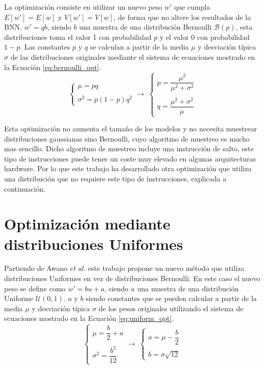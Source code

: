 La optimización consiste en utilizar un nuevo peso $w'$ que cumpla $E[w'] = E[w]$ y $V[w'] = V[w]$, de forma que no altere los resultados de la BNN. $w' = qb$, siendo $b$ una muestra de una distribución Bernoulli $\mathcal{B}(p)$, esta distribuciones toma el valor 1 con probabilidad $p$ y el valor 0 con probabilidad $1-p$. Las constantes $p$ y $q$ se calculan a partir de la media $\mu$ y desviación típica $\sigma$ de las distribuciones originales mediante el sistema de ecuaciones mostrado en la Ecuación \ref{eq:bernoulli_opt}.
\begin{equation}\label{eq:bernoulli_opt}
\begin{cases}
\mu = pq\\ \\
\sigma^2 = p(1-p)q^2
\end{cases}
\rightarrow\ 
\begin{cases}
p = \dfrac{\mu^2}{\mu^2 + \sigma^2}\\ \\
q = \dfrac{\mu^2 + \sigma^2}{\mu}
\end{cases}
\end{equation}

Esta optimización no aumenta el tamaño de los modelos y no necesita muestrear distribuciones gaussianas sino Bernoulli, cuyo algoritmo de muestreo es mucho mas sencillo. Dicho algoritmo de muestreo incluye una instrucción de salto, este tipo de instrucciones puede tener un coste muy elevado en algunas arquitecturas hardware. Por lo que este trabajo ha desarrollado otra optimización que utiliza una distribución que no requiere este tipo de instrucciones, explicada a continuación.

\section{Optimización mediante distribuciones Uniformes}

Partiendo de Awano \emph{et al.} este trabajo propone un nuevo método que utiliza distribuciones Uniformes en vez de distribuciones Bernoulli. En este caso el nuevo peso se define como $w' = bu + a$, siendo $u$ una muestra de una distribución Uniforme $\mathcal{U}(0,1)$. $a$ y $b$ siendo constantes que se pueden calcular a partir de la media $\mu$ y desviación típica $\sigma$ de los pesos originales utilizando el sistema de ecuaciones mostrado en la Ecuación \ref{eq:uniform_opt}.
\begin{equation}\label{eq:uniform_opt}
\begin{cases}
\mu = \dfrac{b}{2} + a\\ \\
\sigma^2 = \dfrac{b^2}{12}
\end{cases}
\rightarrow\ 
\begin{cases}
a = \mu - \dfrac{b}{2}\\ \\
b = \sigma \sqrt{12}
\end{cases}
\end{equation}

